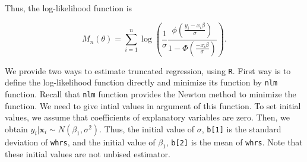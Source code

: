 \documentclass[
  12pt,
]{article}
\begin{document}
Thus, the log-likelihood function is

\begin{equation*}
  M_n(\theta) 
  = \sum_{i=1}^n \log \left( \frac{1}{\sigma} \frac{\phi(\frac{y_i - x_i \beta}{\sigma})}{1 - \Phi(\frac{- x_i \beta}{\sigma})} \right).
\end{equation*}

We provide two ways to estimate truncated regression, using \texttt{R}.
First way is to define the log-likelihood function directly and minimize its function by \texttt{nlm} function.
Recall that \texttt{nlm} function provides the Newton method to minimize the function.
We need to give intial values in argument of this function.
To set initial values, we assume that coefficients of explanatory variables are zero.
Then, we obtain \(y_i | \mathbf{x}_i \sim N(\beta_1, \sigma^2)\).
Thus, the initial value of \(\sigma\), \texttt{b{[}1{]}} is the standard deviation of \texttt{whrs},
and the initial value of \(\beta_1\), \texttt{b{[}2{]}} is the mean of \texttt{whrs}.
Note that these initial values are not unbised estimator.
\end{document}
